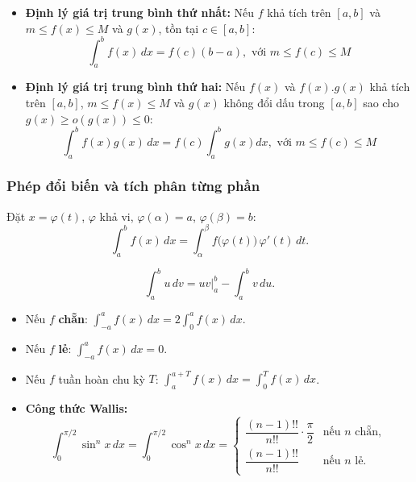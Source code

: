 \documentclass[12pt,a4paper]{article}
\begin{document}
\begin{dinhly}
    \begin{itemize}
        \item \textbf{Định lý giá trị trung bình thứ nhất:} Nếu $f$ khả tích trên $[a,b]$ và $m \le f(x) \le M$ và $g(x)$, tồn tại $c \in [a,b]$:
          \[
            \int_a^b f(x)\,dx = f(c)(b-a), \text{ với } m \le f(c) \le M
          \]
        \item \textbf{Định lý giá trị trung bình thứ hai:} Nếu $f(x)$ và $f(x).g(x)$ khả tích trên $[a, b]$, $m \le f(x) \le M$ và $g(x)$ không đổi dấu trong $[a, b]$ sao cho $g(x) \ge o(g(x)) \le 0$:
            \[
               \int_a^b f(x)g(x)\,dx = f(c)\int_a^b g(x)dx, \text{ với } m \le f(c) \le M
            \]
    \end{itemize}
\end{dinhly}

\subsubsection{Phép đổi biến và tích phân từng phần}

\begin{congthuc}[title={Đổi biến trong tích phân xác định}]
  Đặt $x = \varphi(t)$, $\varphi$ khả vi, $\varphi(\alpha) = a$, $\varphi(\beta) = b$:
  \[
    \int_a^b f(x)\,dx = \int_\alpha^\beta f\bigl(\varphi(t)\bigr)\,\varphi'(t)\,dt.
  \]
\end{congthuc}

\begin{congthuc}[title={Tích phân từng phần}]
  \[
    \int_a^b u\,dv = uv\Big|_a^b - \int_a^b v\,du.
  \]
\end{congthuc}

\begin{tinhchat}[title={Các tính chất đặc biệt}]
  \begin{itemize}
    \item Nếu $f$ \textbf{chẵn}: $\displaystyle\int_{-a}^{a} f(x)\,dx = 2\int_0^a f(x)\,dx$.
    \item Nếu $f$ \textbf{lẻ}: $\displaystyle\int_{-a}^{a} f(x)\,dx = 0$.
    \item Nếu $f$ tuần hoàn chu kỳ $T$: $\displaystyle\int_a^{a+T} f(x)\,dx = \int_0^T f(x)\,dx$.
    \item \textbf{Công thức Wallis:} 
        \[
            \displaystyle\int_0^{\pi/2} \sin^n x\,dx = \int_0^{\pi/2} \cos^n x\,dx = \begin{cases} \dfrac{(n-1)!!}{n!!} \cdot \dfrac{\pi}{2} & \text{nếu } n \text{ chẵn}, \\[6pt] \dfrac{(n-1)!!}{n!!} & \text{nếu } n \text{ lẻ}. \end{cases}
        \]
  \end{itemize}
\end{tinhchat}
\end{document}
